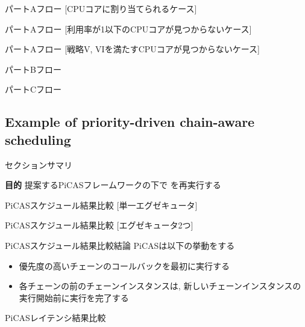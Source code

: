 \begin{frame}{パートAフロー [CPUコアに割り当てられるケース]}
\end{frame}

\begin{frame}{パートAフロー [利用率が1以下のCPUコアが見つからないケース]}
\end{frame}

\begin{frame}{パートAフロー [戦略V, VIを満たすCPUコアが見つからないケース]}
\end{frame}

\begin{frame}{パートBフロー}
\end{frame}

\begin{frame}{パートCフロー}
\end{frame}


\subsection{Example of priority-driven chain-aware scheduling}
\label{ssec: example of priority-driven chain-aware scheduling}

\begin{frame}{セクションサマリ}
    \begin{itembox}[l]{\textbf{目的}}
        提案するPiCASフレームワークの下で  を再実行する
    \end{itembox}
\end{frame}

\begin{frame}{PiCASスケジュール結果比較 [単一エグゼキュータ]}
\end{frame}

\begin{frame}{PiCASスケジュール結果比較 [エグゼキュータ2つ]}
\end{frame}

\begin{frame}{PiCASスケジュール結果比較結論}
    PiCASは以下の挙動をする
    \begin{itemize}
        \item 優先度の高いチェーンのコールバックを最初に実行する
        \item 各チェーンの前のチェーンインスタンスは, 新しいチェーンインスタンスの実行開始前に実行を完了する
    \end{itemize}
\end{frame}

\begin{frame}{PiCASレイテンシ結果比較}
\end{frame}
